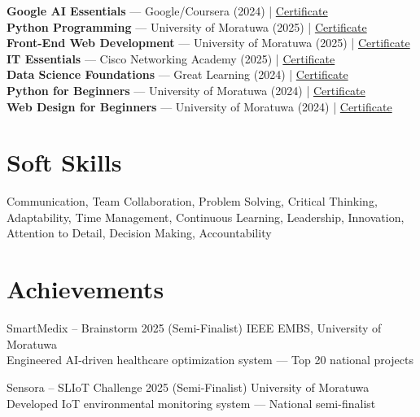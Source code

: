 \documentclass[letterpaper,11.8pt]{article}
\begin{document}
\textbf{Google AI Essentials} — Google/Coursera (2024) | \href{https://coursera.org/verify/specialization/JZOWGO7JRRHB}{Certificate}\\[3pt]
\textbf{Python Programming} — University of Moratuwa (2025) | \href{https://open.uom.lk/verify?code=VTmcj35vju}{Certificate}\\[3pt]
\textbf{Front-End Web Development} — University of Moratuwa (2025) | \href{https://open.uom.lk/verify?code=BHzCLZLb5G}{Certificate}\\[3pt]
\textbf{IT Essentials} — Cisco Networking Academy (2025) | \href{https://www.credly.com/badges/6111bbbe-db9e-438f-981d-c770b9fae03c}{Certificate}\\[3pt]
\textbf{Data Science Foundations} — Great Learning (2024) | \href{https://www.mygreatlearning.com/certificate/XGIRSIHP}{Certificate}\\[3pt]
\textbf{Python for Beginners} — University of Moratuwa (2024) | \href{https://open.uom.lk/verify?code=xw4fpfB8ZS}{Certificate}\\[3pt]
\textbf{Web Design for Beginners} — University of Moratuwa (2024) | \href{https://open.uom.lk/verify?code=kjyQ67aXNP}{Certificate}

\section{Soft Skills}
Communication, Team Collaboration, Problem Solving, Critical Thinking, Adaptability, Time Management, Continuous Learning, Leadership, Innovation, Attention to Detail, Decision Making, Accountability


\section{Achievements}
\vspace{-1pt}

SmartMedix – Brainstorm 2025 (Semi-Finalist) \hfill IEEE EMBS, University of Moratuwa\\
Engineered AI-driven healthcare optimization system — Top 20 national projects

\vspace{5pt}
\noindent Sensora – SLIoT Challenge 2025 (Semi-Finalist) \hfill University of Moratuwa\\
Developed IoT environmental monitoring system — National semi-finalist
\end{document}
